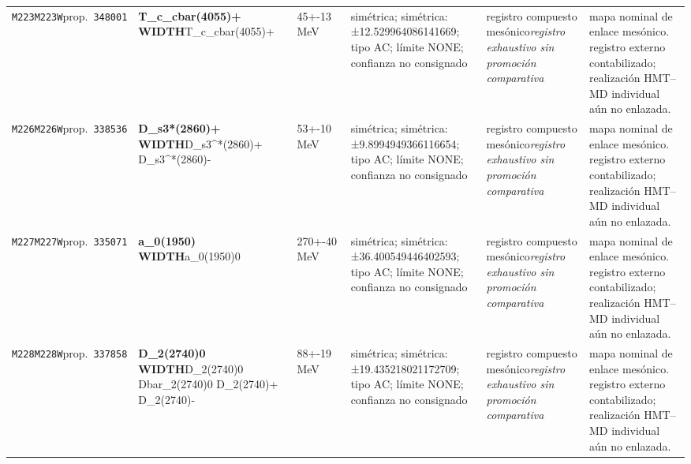 \begin{landscape}
\begin{longtable}{L{1.85cm}L{4.45cm}L{2.35cm}L{4.05cm}L{3.35cm}L{7.15cm}}
\texttt{M223}\newline \texttt{M223W}\newline prop.\ \texttt{348001} & \textbf{T\_\allowbreak{}c\_\allowbreak{}cbar(4055)+ WIDTH}\newline T\_\allowbreak{}c\_\allowbreak{}cbar(4055)+ & 45+-13\,MeV & simétrica; simétrica: ±12.529964086141669; tipo AC; límite NONE; confianza no consignado & registro compuesto mesónico\newline \emph{registro exhaustivo sin promoción comparativa} & mapa nominal de enlace mesónico. registro externo contabilizado; realización HMT--MD individual aún no enlazada. \\
\texttt{M226}\newline \texttt{M226W}\newline prop.\ \texttt{338536} & \textbf{D\_\allowbreak{}s3*(2860)+ WIDTH}\newline D\_\allowbreak{}s3\textasciicircum{}*(2860)+ \textbar{}\allowbreak{} D\_\allowbreak{}s3\textasciicircum{}*(2860)- & 53+-10\,MeV & simétrica; simétrica: ±9.8994949366116654; tipo AC; límite NONE; confianza no consignado & registro compuesto mesónico\newline \emph{registro exhaustivo sin promoción comparativa} & mapa nominal de enlace mesónico. registro externo contabilizado; realización HMT--MD individual aún no enlazada. \\
\texttt{M227}\newline \texttt{M227W}\newline prop.\ \texttt{335071} & \textbf{a\_\allowbreak{}0(1950) WIDTH}\newline a\_\allowbreak{}0(1950)0 & 270+-40\,MeV & simétrica; simétrica: ±36.400549446402593; tipo AC; límite NONE; confianza no consignado & registro compuesto mesónico\newline \emph{registro exhaustivo sin promoción comparativa} & mapa nominal de enlace mesónico. registro externo contabilizado; realización HMT--MD individual aún no enlazada. \\
\texttt{M228}\newline \texttt{M228W}\newline prop.\ \texttt{337858} & \textbf{D\_\allowbreak{}2(2740)0 WIDTH}\newline D\_\allowbreak{}2(2740)0 \textbar{}\allowbreak{} Dbar\_\allowbreak{}2(2740)0 \textbar{}\allowbreak{} D\_\allowbreak{}2(2740)+ \textbar{}\allowbreak{} D\_\allowbreak{}2(2740)- & 88+-19\,MeV & simétrica; simétrica: ±19.435218021172709; tipo AC; límite NONE; confianza no consignado & registro compuesto mesónico\newline \emph{registro exhaustivo sin promoción comparativa} & mapa nominal de enlace mesónico. registro externo contabilizado; realización HMT--MD individual aún no enlazada. \\

\end{longtable}
\end{landscape}
